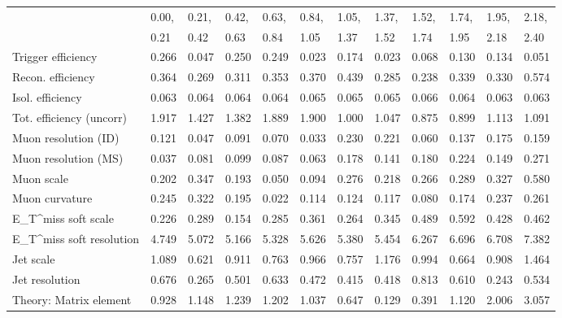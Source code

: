 \begin{tabular}{l|p{0.6cm}p{0.6cm}p{0.6cm}p{0.6cm}p{0.6cm}p{0.6cm}p{0.6cm}p{0.6cm}p{0.6cm}p{0.6cm}p{0.6cm}}
\hline
   & 0.00, & 0.21, & 0.42, & 0.63, & 0.84, & 1.05, & 1.37, & 1.52, & 1.74, & 1.95, & 2.18,  \\ 
   & 0.21 & 0.42 & 0.63 & 0.84 & 1.05 & 1.37 & 1.52 & 1.74 & 1.95 & 2.18 & 2.40  \\ 
\hline
Trigger efficiency                       & 0.266 & 0.047 & 0.250 & 0.249 & 0.023 & 0.174 & 0.023 & 0.068 & 0.130 & 0.134 & 0.051 \\
Recon. efficiency                        & 0.364 & 0.269 & 0.311 & 0.353 & 0.370 & 0.439 & 0.285 & 0.238 & 0.339 & 0.330 & 0.574 \\
Isol. efficiency                         & 0.063 & 0.064 & 0.064 & 0.064 & 0.065 & 0.065 & 0.065 & 0.066 & 0.064 & 0.063 & 0.063 \\
Tot. efficiency (uncorr)                 & 1.917 & 1.427 & 1.382 & 1.889 & 1.900 & 1.000 & 1.047 & 0.875 & 0.899 & 1.113 & 1.091 \\
Muon resolution (ID)                     & 0.121 & 0.047 & 0.091 & 0.070 & 0.033 & 0.230 & 0.221 & 0.060 & 0.137 & 0.175 & 0.159 \\
Muon resolution (MS)                     & 0.037 & 0.081 & 0.099 & 0.087 & 0.063 & 0.178 & 0.141 & 0.180 & 0.224 & 0.149 & 0.271 \\
Muon scale                               & 0.202 & 0.347 & 0.193 & 0.050 & 0.094 & 0.276 & 0.218 & 0.266 & 0.289 & 0.327 & 0.580 \\
Muon curvature                           & 0.245 & 0.322 & 0.195 & 0.022 & 0.114 & 0.124 & 0.117 & 0.080 & 0.174 & 0.237 & 0.261 \\
E_{T}^{miss} soft scale                  & 0.226 & 0.289 & 0.154 & 0.285 & 0.361 & 0.264 & 0.345 & 0.489 & 0.592 & 0.428 & 0.462 \\
E_{T}^{miss} soft resolution             & 4.749 & 5.072 & 5.166 & 5.328 & 5.626 & 5.380 & 5.454 & 6.267 & 6.696 & 6.708 & 7.382 \\
Jet scale                                & 1.089 & 0.621 & 0.911 & 0.763 & 0.966 & 0.757 & 1.176 & 0.994 & 0.664 & 0.908 & 1.464 \\
Jet resolution                           & 0.676 & 0.265 & 0.501 & 0.633 & 0.472 & 0.415 & 0.418 & 0.813 & 0.610 & 0.243 & 0.534 \\
Theory: Matrix element                   & 0.928 & 1.148 & 1.239 & 1.202 & 1.037 & 0.647 & 0.129 & 0.391 & 1.120 & 2.006 & 3.057 \\

\end{tabular}
